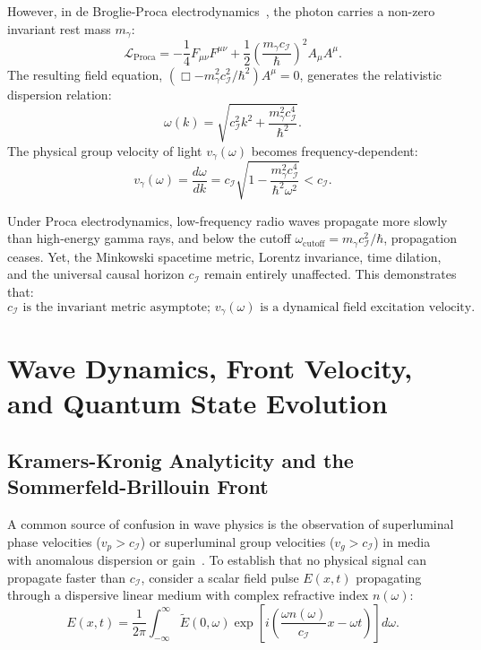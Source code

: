 \documentclass[11pt,a4paper]{article}
\begin{document}
However, in de Broglie-Proca electrodynamics~\cite{tu2005}, the photon carries a non-zero invariant rest mass $m_\gamma$:
\begin{equation}
\mathcal{L}_{\text{Proca}} = -\frac{1}{4} F_{\mu\nu} F^{\mu\nu} + \frac{1}{2} \left(\frac{m_\gamma c_{\mathcal{I}}}{\hbar}\right)^2 A_\mu A^\mu.
\end{equation}
The resulting field equation, $(\Box - m_\gamma^2 c_{\mathcal{I}}^2 / \hbar^2) A^\mu = 0$, generates the relativistic dispersion relation:
\begin{equation}
\omega(k) = \sqrt{c_{\mathcal{I}}^2 k^2 + \frac{m_\gamma^2 c_{\mathcal{I}}^4}{\hbar^2}}.
\end{equation}
The physical group velocity of light $v_\gamma(\omega)$ becomes frequency-dependent:
\begin{equation}
v_\gamma(\omega) = \frac{d\omega}{dk} = c_{\mathcal{I}} \sqrt{1 - \frac{m_\gamma^2 c_{\mathcal{I}}^4}{\hbar^2 \omega^2}} < c_{\mathcal{I}}.
\end{equation}

Under Proca electrodynamics, low-frequency radio waves propagate more slowly than high-energy gamma rays, and below the cutoff $\omega_{\text{cutoff}} = m_\gamma c_{\mathcal{I}}^2 / \hbar$, propagation ceases. Yet, the Minkowski spacetime metric, Lorentz invariance, time dilation, and the universal causal horizon $c_{\mathcal{I}}$ remain entirely unaffected. This demonstrates that:
\begin{equation}
\boxed{c_{\mathcal{I}} \text{ is the invariant metric asymptote; } v_\gamma(\omega) \text{ is a dynamical field excitation velocity.}}
\end{equation}

\section{Wave Dynamics, Front Velocity, and Quantum State Evolution}

\subsection{Kramers-Kronig Analyticity and the Sommerfeld-Brillouin Front}

A common source of confusion in wave physics is the observation of superluminal phase velocities ($v_p > c_{\mathcal{I}}$) or superluminal group velocities ($v_g > c_{\mathcal{I}}$) in media with anomalous dispersion or gain~\cite{wang2000}. To establish that no physical signal can propagate faster than $c_{\mathcal{I}}$, consider a scalar field pulse $E(x, t)$ propagating through a dispersive linear medium with complex refractive index $n(\omega)$:
\begin{equation}
E(x, t) = \frac{1}{2\pi} \int_{-\infty}^{\infty} \tilde{E}(0, \omega) \exp\left[ i\left( \frac{\omega n(\omega)}{c_{\mathcal{I}}} x - \omega t \right) \right] d\omega.
\end{equation}
\end{document}
